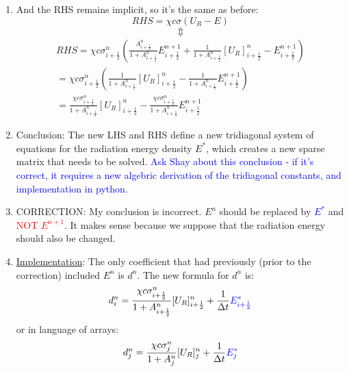 \documentclass[11pt]{article}
\begin{document}
\begin{enumerate}
  \item And the RHS remains implicit, so it's the same as before:
  \begin{equation}
    RHS = \chi c\sigma(U_R-E)
  \end{equation}
  \begin{equation} \Updownarrow \end{equation}
  \begin{equation}
    \begin{gathered}
  RHS = \chi c \sigma_{i+\frac{1}{2}}^{n} \left(\frac{A_{i+\frac{1}{2}}^n}{1 + A_{i+\frac{1}{2}}^n} E_{i+\frac{1}{2}}^{n+1} + \frac{1}{1 + A_{i+\frac{1}{2}}^n}[U_R]_{i+\frac{1}{2}}^n - E_{i+\frac{1}{2}}^{n+1}\right) \\
  = \chi c \sigma_{i+\frac{1}{2}}^{n}
  \left(\frac{1}{1 + A_{i+\frac{1}{2}}^n}[U_R]_{i+\frac{1}{2}}^n -\frac{1}{1 + A_{i+\frac{1}{2}}^n} E_{i+\frac{1}{2}}^{n+1}\right) \\
  = \frac{\chi c \sigma_{i+\frac{1}{2}}^{n}}{1 + A_{i+\frac{1}{2}}^n}[U_R]_{i+\frac{1}{2}}^n - \frac{\chi c \sigma_{i+\frac{1}{2}}^{n}}{1 + A_{i+\frac{1}{2}}^n} E_{i+\frac{1}{2}}^{n+1} 
  \end{gathered}
  \end{equation}
  \item Conclusion: The new LHS and RHS define a new tridiagonal system of equations for the radiation energy density $E^*$, which creates a new sparse matrix that needs to be solved.
  \textcolor{blue}{Ask Shay about this conclusion - if it's correct, it requires a new algebric derivation of the tridiagonal constants, and implementation in python.}

  \item CORRECTION: My conclusion is incorrect. $E^n$ should be replaced by \textcolor{blue}{$E^*$} and \textcolor{red}{NOT $E^{n+1}$}. It makes sense because we suppose that the radiation energy should also be changed.
  
  \item \underline{Implementation}: The only coefficient that had previously (prior to the correction) included $E^n$ is $d^n$. The new formula for $d^n$ is:
  \begin{equation}
    \begin{gathered}
      d_{i}^n = \frac{\chi c \sigma_{i+\frac{1}{2}}^{n}}{1 + A_{i+\frac{1}{2}}^n}[U_R]_{i+\frac{1}{2}}^n + \frac{1}{\Delta t}\textcolor{blue}{E_{i+\frac{1}{2}}^*}
    \end{gathered}
  \end{equation}
  or in language of arrays:
  \begin{equation}
    \begin{gathered}
      d_{j}^n = \frac{\chi c \sigma_{j}^{n}}{1 + A_{j}^n}[U_R]_{j}^n + \frac{1}{\Delta t}\textcolor{blue}{E_{j}^*}
    \end{gathered}
  \end{equation}
\end{enumerate}
\end{document}
